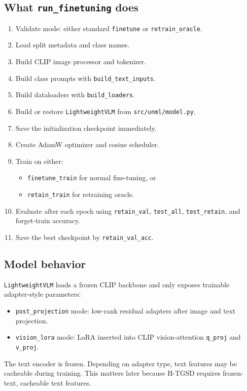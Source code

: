 \documentclass[10pt,a4paper]{article}
\begin{document}
\subsection{What \texttt{run\_finetuning} does}
\begin{enumerate}
  \item Validate mode: either standard \texttt{finetune} or \texttt{retrain\_oracle}.
  \item Load split metadata and class names.
  \item Build CLIP image processor and tokenizer.
  \item Build class prompts with \texttt{build\_text\_inputs}.
  \item Build dataloaders with \texttt{build\_loaders}.
  \item Build or restore \texttt{LightweightVLM} from \texttt{src/unml/model.py}.
  \item Save the initialization checkpoint immediately.
  \item Create AdamW optimizer and cosine scheduler.
  \item Train on either:
  \begin{itemize}
    \item \texttt{finetune\_train} for normal fine-tuning, or
    \item \texttt{retain\_train} for retraining oracle.
  \end{itemize}
  \item Evaluate after each epoch using \texttt{retain\_val}, \texttt{test\_all}, \texttt{test\_retain}, and forget-train accuracy.
  \item Save the best checkpoint by \texttt{retain\_val\_acc}.
\end{enumerate}

\subsection{Model behavior}
\texttt{LightweightVLM} loads a frozen CLIP backbone and only exposes trainable adapter-style parameters:
\begin{itemize}
  \item \texttt{post\_projection} mode: low-rank residual adapters after image and text projection.
  \item \texttt{vision\_lora} mode: LoRA inserted into CLIP vision-attention \texttt{q\_proj} and \texttt{v\_proj}.
\end{itemize}

The text encoder is frozen. Depending on adapter type, text features may be cacheable during training. This matters later because H-TGSD requires frozen-text, cacheable text features.
\end{document}
